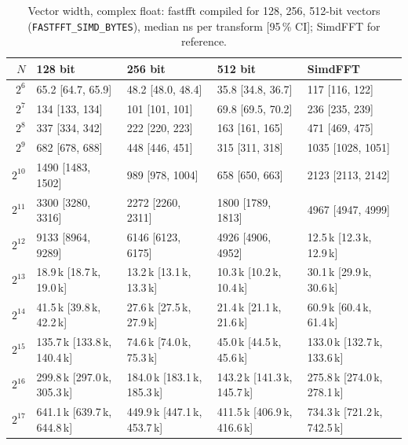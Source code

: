 \begin{table}[h]\centering
\caption{Vector width, complex float: fastfft compiled for 128, 256, 512-bit vectors
(\texttt{FASTFFT\_SIMD\_BYTES}), median ns per transform [95\,\% CI]; SimdFFT for reference.}\label{tab:width}
\begin{tabular}{rllll}\toprule
$N$ & 128 bit & 256 bit & 512 bit & SimdFFT\\\midrule
$2^{6}$ & 65.2 {\scriptsize[64.7, 65.9]} & 48.2 {\scriptsize[48.0, 48.4]} & 35.8 {\scriptsize[34.8, 36.7]} & 117 {\scriptsize[116, 122]}\\
$2^{7}$ & 134 {\scriptsize[133, 134]} & 101 {\scriptsize[101, 101]} & 69.8 {\scriptsize[69.5, 70.2]} & 236 {\scriptsize[235, 239]}\\
$2^{8}$ & 337 {\scriptsize[334, 342]} & 222 {\scriptsize[220, 223]} & 163 {\scriptsize[161, 165]} & 471 {\scriptsize[469, 475]}\\
$2^{9}$ & 682 {\scriptsize[678, 688]} & 448 {\scriptsize[446, 451]} & 315 {\scriptsize[311, 318]} & 1035 {\scriptsize[1028, 1051]}\\
$2^{10}$ & 1490 {\scriptsize[1483, 1502]} & 989 {\scriptsize[978, 1004]} & 658 {\scriptsize[650, 663]} & 2123 {\scriptsize[2113, 2142]}\\
$2^{11}$ & 3300 {\scriptsize[3280, 3316]} & 2272 {\scriptsize[2260, 2311]} & 1800 {\scriptsize[1789, 1813]} & 4967 {\scriptsize[4947, 4999]}\\
$2^{12}$ & 9133 {\scriptsize[8964, 9289]} & 6146 {\scriptsize[6123, 6175]} & 4926 {\scriptsize[4906, 4952]} & 12.5\,k {\scriptsize[12.3\,k, 12.9\,k]}\\
$2^{13}$ & 18.9\,k {\scriptsize[18.7\,k, 19.0\,k]} & 13.2\,k {\scriptsize[13.1\,k, 13.3\,k]} & 10.3\,k {\scriptsize[10.2\,k, 10.4\,k]} & 30.1\,k {\scriptsize[29.9\,k, 30.6\,k]}\\
$2^{14}$ & 41.5\,k {\scriptsize[39.8\,k, 42.2\,k]} & 27.6\,k {\scriptsize[27.5\,k, 27.9\,k]} & 21.4\,k {\scriptsize[21.1\,k, 21.6\,k]} & 60.9\,k {\scriptsize[60.4\,k, 61.4\,k]}\\
$2^{15}$ & 135.7\,k {\scriptsize[133.8\,k, 140.4\,k]} & 74.6\,k {\scriptsize[74.0\,k, 75.3\,k]} & 45.0\,k {\scriptsize[44.5\,k, 45.6\,k]} & 133.0\,k {\scriptsize[132.7\,k, 133.6\,k]}\\
$2^{16}$ & 299.8\,k {\scriptsize[297.0\,k, 305.3\,k]} & 184.0\,k {\scriptsize[183.1\,k, 185.3\,k]} & 143.2\,k {\scriptsize[141.3\,k, 145.7\,k]} & 275.8\,k {\scriptsize[274.0\,k, 278.1\,k]}\\
$2^{17}$ & 641.1\,k {\scriptsize[639.7\,k, 644.8\,k]} & 449.9\,k {\scriptsize[447.1\,k, 453.7\,k]} & 411.5\,k {\scriptsize[406.9\,k, 416.6\,k]} & 734.3\,k {\scriptsize[721.2\,k, 742.5\,k]}\\

\end{tabular}
\end{table}
